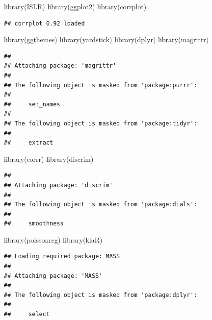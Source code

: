 \documentclass[
]{article}
\newenvironment{Shaded}{\begin{snugshade}}{\end{snugshade}}
\newcommand{\FunctionTok}[1]{\textcolor[rgb]{0.00,0.00,0.00}{#1}}
\newcommand{\NormalTok}[1]{#1}
\begin{document}
\begin{Shaded}
\begin{Highlighting}[]
\FunctionTok{library}\NormalTok{(ISLR)}
\FunctionTok{library}\NormalTok{(ggplot2)}
\FunctionTok{library}\NormalTok{(corrplot)}
\end{Highlighting}
\end{Shaded}

\begin{verbatim}
## corrplot 0.92 loaded
\end{verbatim}

\begin{Shaded}
\begin{Highlighting}[]
\FunctionTok{library}\NormalTok{(ggthemes)}
\FunctionTok{library}\NormalTok{(yardstick)}
\FunctionTok{library}\NormalTok{(dplyr)}
\FunctionTok{library}\NormalTok{(magrittr)}
\end{Highlighting}
\end{Shaded}

\begin{verbatim}
## 
## Attaching package: 'magrittr'
## 
## The following object is masked from 'package:purrr':
## 
##     set_names
## 
## The following object is masked from 'package:tidyr':
## 
##     extract
\end{verbatim}

\begin{Shaded}
\begin{Highlighting}[]
\FunctionTok{library}\NormalTok{(corrr)}
\FunctionTok{library}\NormalTok{(discrim)}
\end{Highlighting}
\end{Shaded}

\begin{verbatim}
## 
## Attaching package: 'discrim'
## 
## The following object is masked from 'package:dials':
## 
##     smoothness
\end{verbatim}

\begin{Shaded}
\begin{Highlighting}[]
\FunctionTok{library}\NormalTok{(poissonreg)}
\FunctionTok{library}\NormalTok{(klaR)}
\end{Highlighting}
\end{Shaded}

\begin{verbatim}
## Loading required package: MASS
## 
## Attaching package: 'MASS'
## 
## The following object is masked from 'package:dplyr':
## 
##     select
\end{verbatim}
\end{document}
